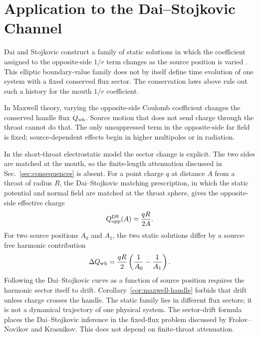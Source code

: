 \documentclass[aps,prd,10pt,onecolumn,nofootinbib,superscriptaddress,floatfix]{revtex4-2}
\begin{document}
\section{Application to the Dai--Stojkovic Channel}
\label{sec:ds}

Dai and Stojkovic construct a family of static solutions in which the
coefficient assigned to the opposite-side $1/r$ term changes as the source
position is varied \cite{DaiStojkovic2019Observing}.  This elliptic
boundary-value family does not by itself define time evolution of one system
with a fixed conserved flux sector.  The conservation laws above rule out such
a history for the mouth $1/r$ coefficient.

In Maxwell theory, varying the opposite-side Coulomb coefficient changes the
conserved handle flux $Q_{\rm wh}$.  Source motion that does not send charge
through the throat cannot do that.  The only unsuppressed term in the
opposite-side far field is fixed; source-dependent effects begin in
higher multipoles or in radiation.

In the short-throat electrostatic model the sector change is explicit.  The two
sides are matched at the mouth, so the finite-length attenuation discussed in
Sec.~\ref{sec:consequences} is absent.  For a point charge $q$ at distance $A$
from a throat of radius $R$, the Dai--Stojkovic matching prescription, in
which the static potential and normal field are matched at the throat sphere,
gives the opposite-side effective charge
\begin{equation}
  Q_{\rm opp}^{\rm DS}(A)=\frac{qR}{2A}.
\end{equation}
For two source positions $A_0$ and $A_1$, the two static solutions differ by a
source-free harmonic contribution
\begin{equation}
  \Delta Q_{\rm wh}
  =
  \frac{qR}{2}\left(\frac{1}{A_0}-\frac{1}{A_1}\right).
\end{equation}
Following the Dai--Stojkovic curve as a function of source position requires
the harmonic sector itself to drift.
Corollary~\ref{cor:maxwell-handle} forbids that drift unless charge crosses the
handle.  The static family lies in different flux sectors; it is not a
dynamical trajectory of one physical system.  The sector-drift formula places
the Dai--Stojkovic inference in the fixed-flux problem discussed by
Frolov--Novikov and Krasnikov.  This does not depend on finite-throat
attenuation.
\end{document}
